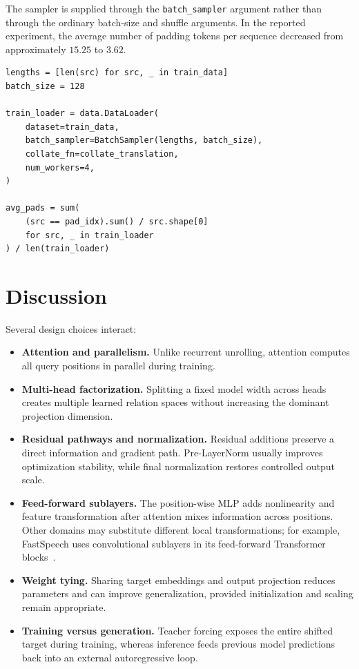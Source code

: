 \documentclass[11pt]{article}
\begin{document}
The sampler is supplied through the \texttt{batch\_sampler} argument rather than through the ordinary batch-size and shuffle arguments. In the reported experiment, the average number of padding tokens per sequence decreased from approximately $15.25$ to $3.62$.

\begin{lstlisting}[caption={Using the length-aware sampler.},label={lst:batch_loader}]
lengths = [len(src) for src, _ in train_data]
batch_size = 128

train_loader = data.DataLoader(
    dataset=train_data,
    batch_sampler=BatchSampler(lengths, batch_size),
    collate_fn=collate_translation,
    num_workers=4,
)

avg_pads = sum(
    (src == pad_idx).sum() / src.shape[0]
    for src, _ in train_loader
) / len(train_loader)
\end{lstlisting}

\section{Discussion}

Several design choices interact:
\begin{itemize}
  \item \textbf{Attention and parallelism.} Unlike recurrent unrolling, attention computes all query positions in parallel during training.
  \item \textbf{Multi-head factorization.} Splitting a fixed model width across heads creates multiple learned relation spaces without increasing the dominant projection dimension.
  \item \textbf{Residual pathways and normalization.} Residual additions preserve a direct information and gradient path. Pre-LayerNorm usually improves optimization stability, while final normalization restores controlled output scale.
  \item \textbf{Feed-forward sublayers.} The position-wise MLP adds nonlinearity and feature transformation after attention mixes information across positions. Other domains may substitute different local transformations; for example, FastSpeech uses convolutional sublayers in its feed-forward Transformer blocks~\cite{ren2019fastspeech}.
  \item \textbf{Weight tying.} Sharing target embeddings and output projection reduces parameters and can improve generalization, provided initialization and scaling remain appropriate.
  \item \textbf{Training versus generation.} Teacher forcing exposes the entire shifted target during training, whereas inference feeds previous model predictions back into an external autoregressive loop.
\end{itemize}
\end{document}
